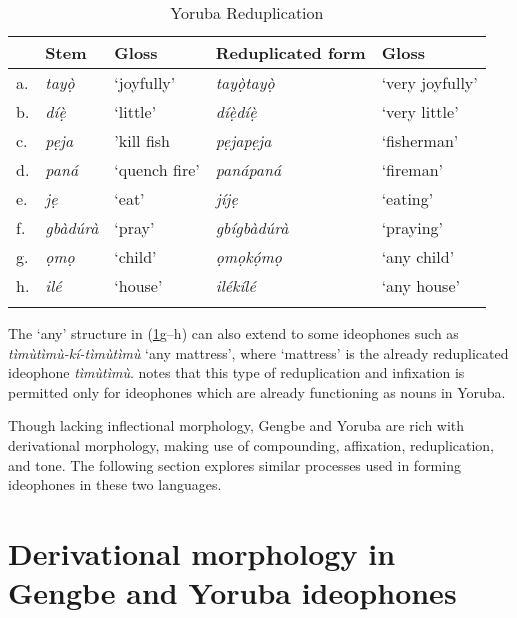 \documentclass[output=paper,colorlinks,citecolor=brown]{langscibook}
\begin{document}
\begin{table}
\caption{Yoruba Reduplication}
\label{tab:RedupYoruba}
 \begin{tabularx}{.9\textwidth}{lllll}
  \lsptoprule
   & Stem    & Gloss       & Reduplicated form & Gloss         \\
   \midrule
a. & \textit{tayọ̀}   & `joyfully'    & \textit{tayọ̀tayọ̀}        & `very joyfully' \\
b. & \textit{díẹ̀}    & `little'      & \textit{díẹ̀díẹ̀ }         & `very little'   \\
c. & \textit{pẹja }   & 'kill fish   & \textit{pẹjapẹja }         & `fisherman'     \\
d. & \textit{paná}    &`quench fire' & \textit{panápaná}        & `fireman'       \\
e. & \textit{jẹ  }    & `eat'         & \textit{jíjẹ }             & `eating'        \\
f. & \textit{gbàdúrà} & `pray'        & \textit{gbígbàdúrà}        & `praying'       \\
g. & \textit{ọmọ}     & `child'       & \textit{ọmọkọ́mọ}          & `any child'     \\
h. & \textit{ilé}     & `house'       & \textit{ilékílé  }         & `any house'    \\
 \lspbottomrule
 \end{tabularx}
\end{table}

The ‘any’ structure in (\ref{tab:RedupYoruba}g--h) can also extend to some ideophones such as \textit{tìmùtìmù-kí-tìmùtìmù} ‘any mattress', where ‘mattress’ is the already reduplicated ideophone \textit{tìmùtìmù}. \citet{Awoyale1981} notes that this type of reduplication and infixation is permitted only for ideophones which are already functioning as nouns in Yoruba.
 
Though lacking inflectional morphology, Gengbe and Yoruba are rich with derivational morphology, making use of compounding, affixation, reduplication, and tone. The following section explores similar processes used in forming ideophones in these two languages.

\section{Derivational morphology in Gengbe and Yoruba ideophones} \label{sec_derivatioanlgengbe}
\end{document}
